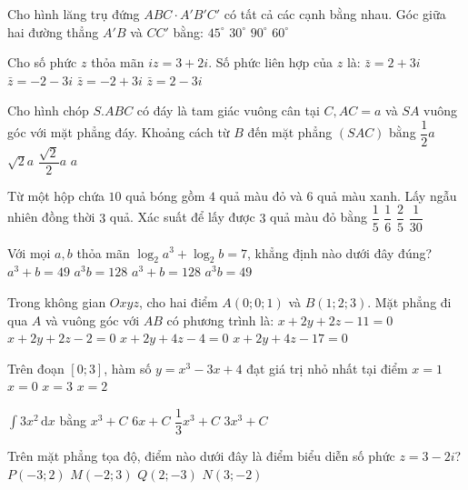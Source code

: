 \begin{ex}%
Cho hình lăng trụ đứng $ABC \cdot A'B'C'$ có tất cả các cạnh bằng nhau. Góc giữa hai đường thẳng $A'B$ và $CC'$ bằng:
\choice
{\True $45^{\circ}$}
{$30^{\circ}$}
{$90^{\circ}$}
{$60^{\circ}$}

\end{ex}
\begin{ex}%
Cho số phức $z$ thỏa mãn $i z=3+2 i$. Số phức liên hợp của $z$ là:
\choice
{\True $\bar{z}=2+3 i$}
{$\bar{z}=-2-3 i$}
{$\bar{z}=-2+3 i$}
{$\bar{z}=2-3 i$}

\end{ex}
\begin{ex}%
Cho hình chóp $S.ABC$ có đáy là tam giác vuông cân tại $C, AC=a$ và $SA$ vuông góc với mặt phẳng đáy. Khoảng cách từ $B$ đến mặt phẳng $(SAC)$ bằng
\choice
{$\dfrac{1}{2} a$}
{$\sqrt{2} a$}
{$\dfrac{\sqrt{2}}{2} a$}
{\True $a$}

\end{ex}
\begin{ex}%
Từ một hộp chứa $10$ quả bóng gồm $4$ quả màu đỏ và $6$ quả màu xanh. Lấy ngẫu nhiên đồng thời $3$ quả. Xác suất để lấy được $3$ quả màu đỏ bằng
\choice
{$\dfrac{1}{5}$}
{$\dfrac{1}{6}$}
{$\dfrac{2}{5}$}
{\True $\dfrac{1}{30}$}

\end{ex}
\begin{ex}%
Với mọi $a, b$ thỏa mãn $\log_2 a^3+\log_2 b=7$, khẳng định nào dưới đây đúng?
\choice
{$a^3+b=49$}
{$a^3 b=128$}
{\True $a^3+b=128$}
{$a^3 b=49$}

\end{ex}
\begin{ex}%
Trong không gian $O x y z$, cho hai điểm $A(0; 0; 1)$ và $B(1; 2; 3)$. Mặt phẳng đi qua $A$ và vuông góc với $AB$ có phương trình là:
\choice
{$x+2 y+2 z-11=0$}
{\True $x+2 y+2 z-2=0$}
{$x+2 y+4 z-4=0$}
{$x+2 y+4 z-17=0$}

\end{ex}
\begin{ex}%
Trên đoạn $[0; 3]$, hàm số $y=x^3-3 x+4$ đạt giá trị nhỏ nhất tại điểm
\choice
{\True $x=1$}
{$x=0$}
{$x=3$}
{$x=2$}

\end{ex}
\begin{ex}%
$\displaystyle\int 3 x^2 \mathrm{\,d} x$ bằng
\choice
{\True $x^3+C$}
{$6 x+C$}
{$\dfrac{1}{3} x^3+C$}
{$3 x^3+C$}

\end{ex}
\begin{ex}%
Trên mặt phẳng tọa độ, điểm nào dưới đây là điểm biểu diễn số phức $z=3-2 i$?
\choice
{$P(-3; 2)$}
{$M(-2; 3)$}
{$Q(2;-3)$}
{\True $N(3;-2)$}

\end{ex}
